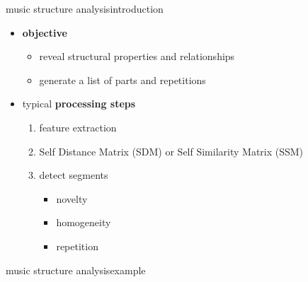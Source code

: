         \begin{frame}{music structure analysis}{introduction}
            \begin{itemize}
                \item   \textbf{objective}
                    \begin{itemize}
                        \item   reveal structural properties and relationships
                        \item   generate a list of parts and repetitions
                    \end{itemize}
                \bigskip
                \item   typical \textbf{processing steps}
                    \begin{enumerate}
                        \item   feature extraction
                        \item   Self Distance Matrix (SDM) or Self Similarity Matrix (SSM)
                        \item   detect segments
                            \begin{itemize}
                                \item novelty
                                \item homogeneity
                                \item repetition
                            \end{itemize}
                    \end{enumerate}
            \end{itemize}
        \end{frame}
        \begin{frame}{music structure analysis}{example}
            {}
        \end{frame}
